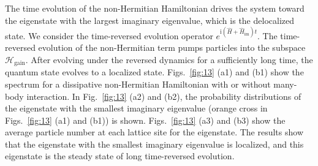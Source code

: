 \documentclass[longbibliography, aps, prx, amsmath, amssymb, amsfonts, twocolumn,superscriptaddress, footinbib]{revtex4-1}
\begin{document}
	The time evolution of the  non-Hermitian Hamiltonian drives the system toward the eigenstate with the largest imaginary eigenvalue, which is the delocalized state.
	We consider the time-reversed evolution operator $e^{\mathrm{i}(\hat{H} + \hat{H}_{\text{im}})t}$. The time-reversed evolution of the non-Hermitian term pumps particles into the subspace $\mathscr{H}_{\text{gain}}$. After evolving under the reversed dynamics for a sufficiently long time, the quantum state evolves to a localized state.
	Figs.~\ref{fig:13} (a1) and (b1) show the spectrum for a dissipative non-Hermitian Hamiltonian with or without many-body interaction. 
	In Fig.~\ref{fig:13} (a2) and (b2), the probability distributions of the eigenstate with the smallest imaginary eigenvalue (orange cross in Figs.~\ref{fig:13} (a1) and (b1)) is shown.
	Figs.~\ref{fig:13} (a3) and (b3) show the average particle number at each lattice site for the eigenstate. 
	The results show that the eigenstate with the smallest imaginary eigenvalue is localized, and this eigenstate is the steady state of long time-reversed evolution. 
\end{document}

